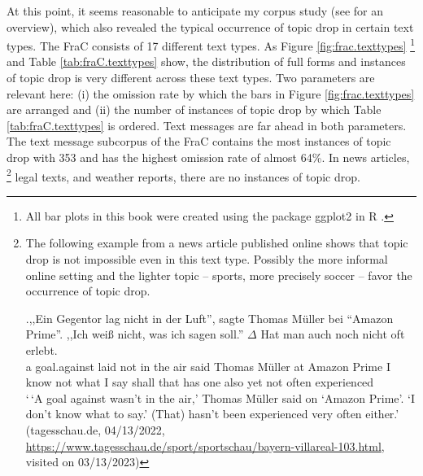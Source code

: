 At this point, it seems reasonable to anticipate my corpus study (see  for an overview), which also revealed the typical occurrence of topic drop in certain text types.
The FraC consists of 17 different text types. 
As Figure \ref{fig:frac.texttypes}%
\footnote{All bar plots in this book were created using the package ggplot2 \citep{wickham2016} in R \citep{rcoreteam2021}.}
%
and Table \ref{tab:fraC.texttypes} show, the distribution of full forms and instances of topic drop is very different across these text types.
Two parameters are relevant here: (i) the omission rate by which the bars in Figure \ref{fig:frac.texttypes} are arranged and (ii) the number of instances of topic drop by which Table \ref{tab:fraC.texttypes} is ordered.
Text messages are far ahead in both parameters.
The text message subcorpus of the FraC contains the most instances of topic drop with 353 and has the highest omission rate of almost 64\%.
In news articles,%
\footnote{The following example from a news article published online shows that topic drop is not impossible even in this text type.
Possibly the more informal online setting and the lighter topic -- sports, more precisely soccer -- favor the occurrence of topic drop.

\exg.,,Ein Gegentor lag nicht in der Luft'', sagte Thomas Müller bei ``Amazon Prime''. ,,Ich weiß nicht, was ich sagen soll.'' $\Delta$ Hat man auch noch nicht oft erlebt.\\
\phantom{,,}a goal.against laid not in the air said Thomas Müller at Amazon Prime \phantom{,,}I know not what I say shall that has one also yet not often experienced\\
`\,`A goal against wasn't in the air,' Thomas Müller said on `Amazon Prime'. `I don't know what to say.' (That) hasn't been experienced very often either.' (tagesschau.de, 04/13/2022, \url{https://www.tagesschau.de/sport/sportschau/bayern-villareal-103.html}, visited on 03/13/2023)
}
legal texts, and weather reports, there are no instances of topic drop.


